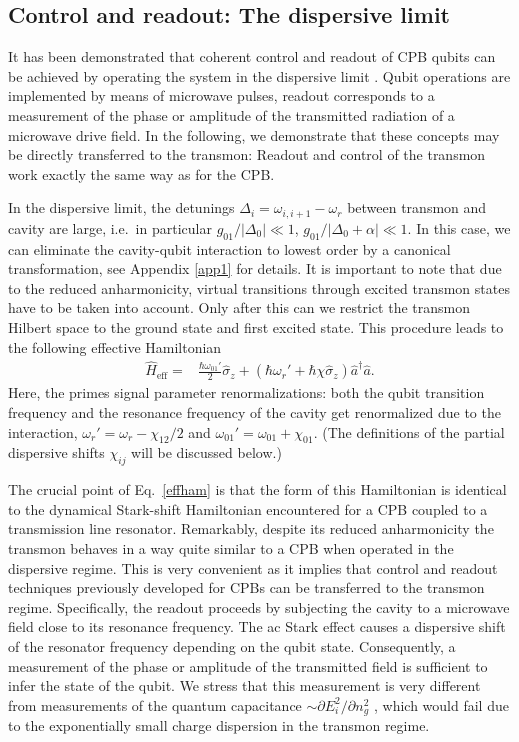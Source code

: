 \documentclass[twocolumn,amsmath,amssymb,floatfix,pra,showpacs,eqsecnum,footinbib,superscriptaddress]{revtex4}
\newcommand{\abs}[1]{\left|#1\right|}
\begin{document}
\subsection{Control and readout: The dispersive limit\label{sec:dispersive}}
It has been demonstrated that coherent control and readout of CPB qubits can be achieved by operating the system in the dispersive limit \cite{blais1,wallraff}.  Qubit operations are implemented by means of microwave pulses, readout corresponds to a measurement of the phase or amplitude of the transmitted radiation of a microwave drive field.  In the following, we demonstrate that these concepts may be directly transferred to the transmon: Readout and control of the transmon work exactly the same way as for the CPB.

In the dispersive limit, the detunings $\Delta_i=\omega_{i,i+1}-\omega_r$ between transmon and cavity are large, i.e.~in particular $g_{01}/\abs{\Delta_0}\ll1$, $g_{01}/\abs{\Delta_0+\alpha}\ll1$. In this case, we can eliminate the cavity-qubit interaction to lowest order by a canonical transformation, see Appendix \ref{app1} for details. It is important to note that due to the reduced anharmonicity, virtual transitions through excited transmon states have to be taken into account. Only after this can we restrict the transmon Hilbert space to the ground state and first excited state. This procedure leads to the following effective Hamiltonian
\begin{align}\label{effham}
\hat{H}_\text{eff}
= &\frac{\hbar\omega_{01}'}{2}\hat{\sigma}_z +\left(\hbar\omega_r'+ \hbar\chi \hat{\sigma}_z\right) \hat{a}^\dag \hat{a}. %
\end{align}
Here, the primes signal parameter renormalizations: both the qubit transition frequency and the resonance frequency of the cavity get renormalized due to the interaction, $\omega_r' = \omega_r -\chi_{12}/2$ and $\omega_{01}'=\omega_{01}+\chi_{01}$. (The definitions of the partial dispersive shifts $\chi_{ij}$ will be discussed below.)

The crucial point of Eq.~\eqref{effham} is that the form of this Hamiltonian is identical to the dynamical Stark-shift Hamiltonian encountered for a CPB coupled to a transmission line resonator\cite{blais1, gambetta}. Remarkably, despite its reduced anharmonicity the transmon behaves in a way quite similar to a CPB when operated in the dispersive regime. This is very convenient as it implies that control and readout techniques previously developed for CPBs can be transferred to the transmon regime. Specifically, the readout proceeds by subjecting the cavity to a microwave field close to its resonance frequency. The ac Stark effect causes a dispersive shift of the resonator frequency depending on the qubit state. Consequently, a measurement of the phase or amplitude of the transmitted field is sufficient to infer the state of the qubit. We stress that this measurement is very different from measurements of the quantum capacitance $\sim\partial E_{i}^2/\partial n_g^2$ \cite{duty}, which would fail due to the exponentially small charge dispersion in the transmon regime.
\end{document}
